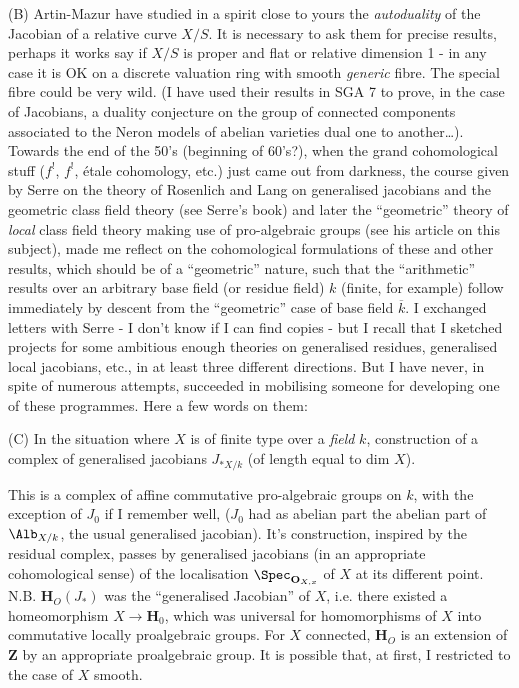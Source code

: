 (B) Artin-Mazur have studied in a spirit close to yours the \emph{autoduality} of the Jacobian of a relative curve $X/S$. It is necessary to ask them for precise results, perhaps it works say if $X/S$ is proper and flat or relative dimension 1 - in any case it is OK on a discrete valuation ring with smooth \emph{generic} fibre. The special fibre could be very wild. (I have used their results in SGA 7 to prove, in the case of Jacobians, a duality conjecture on the group of connected components associated to the Neron models of abelian varieties dual one to another\dots). 
Towards the end of the 50's (beginning of 60's?), when the grand cohomological stuff ($f^!$, $f^!$, étale cohomology, etc.) just came out from darkness, the course given by Serre on the theory of Rosenlich and Lang on generalised jacobians and the geometric class field theory (see Serre's book) and later the ``geometric'' theory of \emph{local} class field theory making use of pro-algebraic groups (see his article on this subject), made me reflect on the cohomological formulations of these and other results, which should be of a ``geometric'' nature, such that the ``arithmetic'' results over an arbitrary base field (or residue field) $k$ (finite, for example) follow immediately by descent from the ``geometric'' case of base field $\overline{k}$. I exchanged letters with Serre - I don't know if I can find copies - but I recall that I sketched projects for some ambitious enough theories on generalised residues, generalised local jacobians, etc.,  in at least three different directions. But I have never, in spite of numerous attempts, succeeded in mobilising someone for developing one of these programmes. Here a few words on them: 

\starsbreak

\label{sec:app11}%
(C) In the situation where $X$ is of finite type over a \emph{field} $k$, construction of a complex of generalised jacobians $J_{* X/k}$ (of length equal to dim $X$).
    
    This is a complex of affine commutative pro-algebraic groups on $k$, with the exception of $J_0$ if I remember well, ($J_0$ had as abelian part the abelian part of $\Alb_{X/k}$, the usual generalised jacobian). It's construction, inspired by the residual complex, passes by generalised jacobians (in an appropriate cohomological sense) of the localisation $\Spec_{\mathbf{O}_{X, x}}$ of $X$ at its different point.
N.B. $\mathbf{H}_O (J_*)$ was the ``generalised Jacobian'' of $X$, i.e. there existed a homeomorphism $X \to \mathbf{H}_0$, which was universal for homomorphisms of $X$ into commutative locally proalgebraic groups. For $X$ connected, $\mathbf{H}_O$ is an extension of $\mathbf{Z}$ by an appropriate proalgebraic group. It is possible that, at first, I restricted to the case of $X$ smooth.

